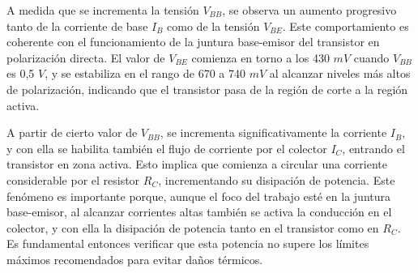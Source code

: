 A medida que se incrementa la tensión $V_{BB}$, se observa un aumento progresivo tanto de la corriente de base $I_{B}$ como de la tensión $V_{BE}$. Este comportamiento es coherente con el funcionamiento de la juntura base-emisor del transistor en polarización directa. El valor de $V_{BE}$ comienza en torno a los 430 $mV$ cuando $V_{BB}$ es 0,5 $V$, y se estabiliza en el rango de 670 a 740 $mV$ al alcanzar niveles más altos de polarización, indicando que el transistor pasa de la región de corte a la región activa.

A partir de cierto valor de $V_{BB}$, se incrementa significativamente la corriente $I_B$, y con ella se habilita también el flujo de corriente por el colector $I_C$, entrando el transistor en zona activa. Esto implica que comienza a circular una corriente considerable por el resistor $R_C$, incrementando su disipación de potencia. Este fenómeno es importante porque, aunque el foco del trabajo esté en la juntura base-emisor, al alcanzar corrientes altas también se activa la conducción en el colector, y con ella la disipación de potencia tanto en el transistor como en $R_C$. Es fundamental entonces verificar que esta potencia no supere los límites máximos recomendados para evitar daños térmicos.

\newpage

